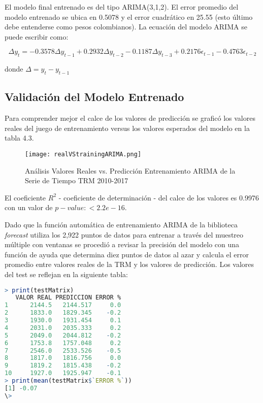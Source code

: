 El modelo final entrenado es del tipo ARIMA(3,1,2). El error promedio del modelo entrenado se ubica en 0.5078 y el error cuadrático en 25.55 (esto último debe entenderse como pesos colombianos). La ecuación del modelo ARIMA se puede escribir como:

\begin{equation}
    \Delta y_t = -0.3578 \Delta y_{t-1} + 0.2932 \Delta y_{t-2} - 0.1187 \Delta y_{t-3} + 0.2176 \epsilon_{t-1} - 
    0.4763 \epsilon_{t-2}
\end{equation}

donde $\Delta = y_{t} - y_{t-1}$

\subsection{Validación del Modelo Entrenado}
Para comprender mejor el calce de los valores de predicción se graficó los valores reales del juego de entrenamiento versus los valores esperados del modelo en la tabla 4.3. 

\begin{figure}[H]
    \centering
    \texttt{[image: realVStrainingARIMA.png]}
    \caption{Análisis Valores Reales vs. Predicción Entrenamiento ARIMA de la Serie de Tiempo TRM 2010-2017}
\end{figure}   

El coeficiente $R^2$ - coeficiente de determinación - del calce de los valores es 0.9976 con un valor de $p-value: < 2.2e-16$. 

Dado que la función automática de entrenamiento ARIMA de la biblioteca \emph{forecast} utiliza los 2,922 puntos de datos para entrenar a través del muestreo múltiple con ventanas se procedió a revisar la precisión del modelo con una función de ayuda que determina diez puntos de datos al azar y calcula el error promedio entre valores reales de la TRM y los valores de predicción. Los valores del test se reflejan en la siguiente tabla:

\begin{lstlisting}[language=R]
> print(testMatrix)
   VALOR REAL PREDICCION ERROR %
1      2144.5   2144.517     0.0
2      1833.0   1829.345    -0.2
3      1930.0   1931.454     0.1
4      2031.0   2035.333     0.2
5      2049.0   2044.812    -0.2
6      1753.8   1757.048     0.2
7      2546.0   2533.526    -0.5
8      1817.0   1816.756     0.0
9      1819.2   1815.438    -0.2
10     1927.0   1925.947    -0.1
> print(mean(testMatrix$`ERROR %`))
[1] -0.07
\> 
\end{lstlisting}

